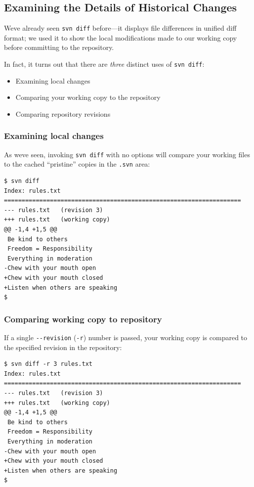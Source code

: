 \subsection{Examining the Details of Historical
Changes}\label{svn.tour.history.diff}

We\textquotesingle ve already seen \texttt{svn\ diff} before---it
displays file differences in unified diff format; we used it to show the
local modifications made to our working copy before committing to the
repository.

In fact, it turns out that there are \emph{three} distinct uses of
\texttt{svn\ diff}:

\begin{itemize}
\item
  Examining local changes
\item
  Comparing your working copy to the repository
\item
  Comparing repository revisions
\end{itemize}

\subsubsection{Examining local
changes}\label{svn.tour.history.diff.local}

As we\textquotesingle ve seen, invoking \texttt{svn\ diff} with no
options will compare your working files to the cached ``pristine''
copies in the \texttt{.svn} area:

\begin{verbatim}
$ svn diff
Index: rules.txt
===================================================================
--- rules.txt   (revision 3)
+++ rules.txt   (working copy)
@@ -1,4 +1,5 @@
 Be kind to others
 Freedom = Responsibility
 Everything in moderation
-Chew with your mouth open
+Chew with your mouth closed
+Listen when others are speaking
$
\end{verbatim}

\subsubsection{Comparing working copy to
repository}\label{svn.tour.history.diff.wcrepos}

If a single \texttt{-\/-revision} (\texttt{-r}) number is passed, your
working copy is compared to the specified revision in the repository:

\begin{verbatim}
$ svn diff -r 3 rules.txt
Index: rules.txt
===================================================================
--- rules.txt   (revision 3)
+++ rules.txt   (working copy)
@@ -1,4 +1,5 @@
 Be kind to others
 Freedom = Responsibility
 Everything in moderation
-Chew with your mouth open
+Chew with your mouth closed
+Listen when others are speaking
$
\end{verbatim}

